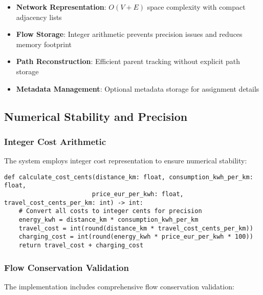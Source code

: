\documentclass[12pt,a4paper]{article}
\begin{document}
\begin{itemize}
\item \textbf{Network Representation}: $O(V + E)$ space complexity with compact adjacency lists
\item \textbf{Flow Storage}: Integer arithmetic prevents precision issues and reduces memory footprint
\item \textbf{Path Reconstruction}: Efficient parent tracking without explicit path storage
\item \textbf{Metadata Management}: Optional metadata storage for assignment details
\end{itemize}

\subsection{Numerical Stability and Precision}

\subsubsection{Integer Cost Arithmetic}

The system employs integer cost representation to ensure numerical stability:

\begin{lstlisting}[caption=Cost Conversion and Precision Management]
def calculate_cost_cents(distance_km: float, consumption_kwh_per_km: float, 
                        price_eur_per_kwh: float, travel_cost_cents_per_km: int) -> int:
    # Convert all costs to integer cents for precision
    energy_kwh = distance_km * consumption_kwh_per_km
    travel_cost = int(round(distance_km * travel_cost_cents_per_km))
    charging_cost = int(round(energy_kwh * price_eur_per_kwh * 100))
    return travel_cost + charging_cost
\end{lstlisting}

\subsubsection{Flow Conservation Validation}

The implementation includes comprehensive flow conservation validation:
\end{document}
